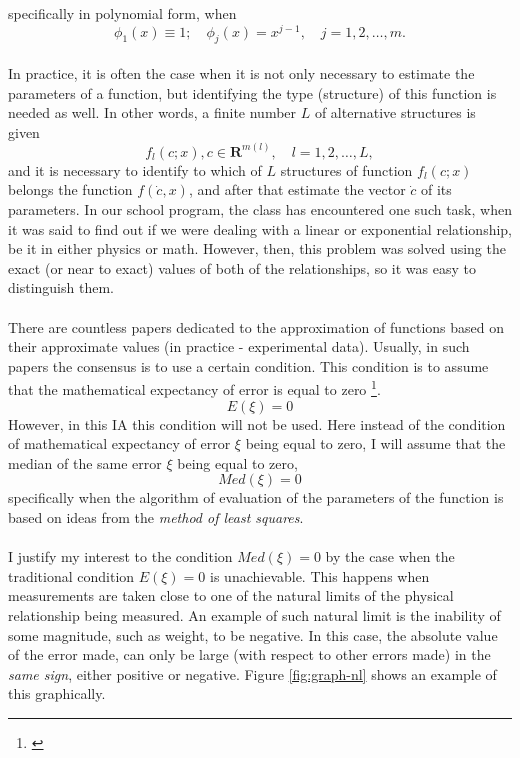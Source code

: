 specifically in polynomial form, when
\begin{equation}
\phi_{1}(x)\equiv 1; \quad \phi_{j}(x)=x^{j-1},\quad j=1,2,\dots,m.
\end{equation}
\\
In practice, it is often the case when it is not only necessary to estimate the parameters of a function, but identifying the type (structure) of this function is needed as well. In other words, a finite number $L$ of alternative structures is given
\begin{equation}
f_{l}(c;x), c \in \boldsymbol{R}^{m(l)}, \quad l=1,2,\dots,L,
\end{equation}
and it is necessary to identify to which of $L$ structures of function $f_{l}(c;x)$ belongs the function $f(\dot{c},x)$, and after that estimate the vector $\dot{c}$ of its parameters. In our school program, the class has encountered one such task, when it was said to find out if we were dealing with a linear or exponential relationship, be it in either physics or math. However, then, this problem was solved using the exact (or near to exact) values of both of the relationships, so it was easy to distinguish them. \\
\\
There are countless papers dedicated to the approximation of functions based on their approximate values (in practice - experimental data). Usually, in such papers the consensus is to use a certain condition. This condition is to assume that the mathematical expectancy of error is equal to zero \footnote{\cite{Plackett_1950}}.
\begin{equation}
E(\xi)=0
\end{equation}
 However, in this IA this condition will not be used. Here instead of the condition of mathematical expectancy of error $\xi$ being equal to zero, I will assume that the median of the same error $\xi$ being equal to zero, 
\begin{equation}
Med(\xi)=0
\end{equation}
specifically when the algorithm of evaluation of the parameters of the function is based on ideas from the \textit{method of least squares}. \\
\\
I justify my interest to the condition $Med(\xi)=0$ by the case when the traditional condition $E(\xi)=0$ is unachievable. This happens when measurements are taken close to one of the natural limits of the physical relationship being measured. An example of such natural limit is the inability of some magnitude, such as weight, to be negative. In this case, the absolute value of the error made, can only be large (with respect to other errors made) in the \textit{same sign}, either positive or negative. Figure \ref{fig:graph-nl} shows an example of this graphically.
